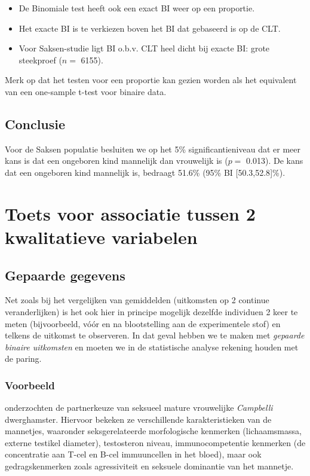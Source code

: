 \documentclass[
  12pt,dutch]{book}
\theoremstyle{definition}
\theoremstyle{definition}
\theoremstyle{definition}
\theoremstyle{definition}
\theoremstyle{remark}
\begin{document}
\begin{itemize}
\item
  De Binomiale test heeft ook een exact BI weer op een proportie.
\item
  Het exacte BI is te verkiezen boven het BI dat gebaseerd is op de CLT.
\item
  Voor Saksen-studie ligt BI o.b.v. CLT heel dicht bij exacte BI: grote steekproef (\(n=\) 6155).
\end{itemize}

Merk op dat het testen voor een proportie kan gezien worden als het equivalent van een one-sample t-test voor binaire data.

\subsection{Conclusie}\label{conclusie}

Voor de Saksen populatie besluiten we op het 5\% significantieniveau dat er meer kans is dat een ongeboren kind mannelijk dan vrouwelijk is (\(p=\) 0.013).
De kans dat een ongeboren kind mannelijk is, bedraagt 51.6\% (95\% BI {[}50.3,52.8{]}\%).

\section{Toets voor associatie tussen 2 kwalitatieve variabelen}\label{toets-voor-associatie-tussen-2-kwalitatieve-variabelen}

\subsection{Gepaarde gegevens}\label{gepaarde-gegevens}

Net zoals bij het vergelijken van
gemiddelden (uitkomsten op 2 continue veranderlijken) is het ook hier in
principe mogelijk dezelfde individuen 2 keer te meten (bijvoorbeeld,
vóór en na blootstelling aan de experimentele stof) en telkens de
uitkomst te observeren. In dat geval hebben we te maken met \emph{gepaarde
binaire uitkomsten} en moeten we in de statistische analyse rekening houden
met de paring.

\subsubsection{Voorbeeld}\label{voorbeeld}

\citet{Rogovin2017} onderzochten de partnerkeuze van seksueel mature vrouwelijke \emph{Campbelli} dwerghamster.
Hiervoor bekeken ze verschillende karakteristieken van de mannetjes, waaronder seksgerelateerde morfologische kenmerken (lichaamsmassa, externe testikel diameter), testosteron niveau, immunocompetentie kenmerken (de concentratie aan T-cel en B-cel immuuncellen in het bloed), maar ook gedragskenmerken zoals agressiviteit en seksuele dominantie van het mannetje.
\end{document}
